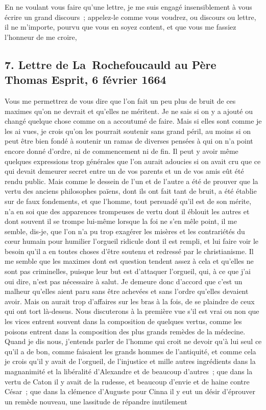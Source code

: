 \documentclass[french,twoside]{book} %
\newcommand{\dateline}[1]{\medskip{\RaggedLeft{#1}\par}\bigskip}
\newcommand{\salute}[1]{\bigbreak{#1}\par\medbreak}
\newcommand{\signed}[1]{\bigbreak\filbreak{\raggedleft #1\par}\medskip}
\begin{document}
En ne voulant vous faire qu’une lettre, je me suis engagé insensiblement à vous écrire un grand discours ; appelez-le comme vous voudrez, ou discours ou lettre, il ne m’importe, pourvu que vous en soyez content, et que vous me fassiez l’honneur de me croire,\par

\salute{Monsieur,}


\signed{Votre, etc.}
\subsection[{7. Lettre de La Rochefoucauld au Père Thomas Esprit, 6 février 1664}]{7. Lettre de La Rochefoucauld au Père Thomas Esprit, 6 février 1664}

\dateline{6 février.}
\noindent Vous me permettrez de vous dire que l’on fait un peu plus de bruit de ces maximes qu’on ne devrait et qu’elles ne méritent. Je ne sais si on y a ajouté ou changé quelque chose comme on a accoutumé de faire. Mais si elles sont comme je les ai vues, je crois qu’on les pourrait soutenir sans grand péril, au moins si on peut être bien fondé à soutenir un ramas de diverses pensées à qui on n’a point encore donné d’ordre, ni de commencement ni de fin. Il peut y avoir même quelques expressions trop générales que l’on aurait adoucies si on avait cru que ce qui devait demeurer secret entre un de vos parents et un de vos amis eût été rendu public. Mais comme le dessein de l’un et de l’autre a été de prouver que la vertu des anciens philosophes païens, dont ils ont fait tant de bruit, a été établie sur de faux fondements, et que l’homme, tout persuadé qu’il est de son mérite, n’a en soi que des apparences trompeuses de vertu dont il éblouit les autres et dont souvent il se trompe lui-même lorsque la foi ne s’en mêle point, il me semble, dis-je, que l’on n’a pu trop exagérer les misères et les contrariétés du cœur humain pour humilier l’orgueil ridicule dont il est rempli, et lui faire voir le besoin qu’il a en toutes choses d’être soutenu et redressé par le christianisme. Il me semble que les maximes dont est question tendent assez à cela et qu’elles ne sont pas criminelles, puisque leur but est d’attaquer l’orgueil, qui, à ce que j’ai oui dire, n’est pas nécessaire à salut. Je demeure donc d’accord que c’est un malheur qu’elles aient paru sans être achevées et sans l’ordre qu’elles devaient avoir. Mais on aurait trop d’affaires sur les bras à la fois, de se plaindre de ceux qui ont tort là-dessus. Nous discuterons à la première vue s’il est vrai ou non que les vices entrent souvent dans la composition de quelques vertus, comme les poisons entrent dans la composition des plus grands remèdes de la médecine. Quand je dis nous, j’entends parler de l’homme qui croit ne devoir qu’à lui seul ce qu’il a de bon, comme faisaient les grands hommes de l’antiquité, et comme cela je crois qu’il y avait de l’orgueil, de l’injustice et mille autres ingrédients dans la magnanimité et la libéralité d’Alexandre et de beaucoup d’autres ; que dans la vertu de Caton il y avait de la rudesse, et beaucoup d’envie et de haine contre César ; que dans la clémence d’Auguste pour Cinna il y eut un désir d’éprouver un remède nouveau, une lassitude de répandre inutilement 
\end{document}
